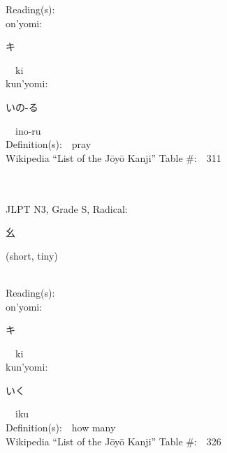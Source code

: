 \begin{multicols}{2}
Reading(s):\ \ \\
{\hspace*{1em}}on'yomi:\ \ \\
{\hspace*{2em}}{\begin{CJK}{UTF8}{min} キ \end{CJK}}\ \ ki\ \ \\
{\hspace*{1em}}kun'yomi:\ \ \\
{\hspace*{2em}}{\begin{CJK}{UTF8}{min} いの-る \end{CJK}}\ \ ino-ru\ \ \\
Definition(s):\ \ pray \\
Wikipedia ``List of the J\=oy\=o Kanji'' Table \#:\ \ 311 \\
\ \ \\
{\fontsize{34pt}{40pt}  }\ \ \\  %
{JLPT N3, Grade S, Radical:\ \ {\begin{CJK}{UTF8}{min} 幺 \end{CJK}} (short, tiny) } \\
Reading(s):\ \ \\
{\hspace*{1em}}on'yomi:\ \ \\
{\hspace*{2em}}{\begin{CJK}{UTF8}{min} キ \end{CJK}}\ \ ki\ \ \\
{\hspace*{1em}}kun'yomi:\ \ \\
{\hspace*{2em}}{\begin{CJK}{UTF8}{min} いく \end{CJK}}\ \ iku\ \ \\
Definition(s):\ \ how many \\
Wikipedia ``List of the J\=oy\=o Kanji'' Table \#:\ \ 326 \\
\ \ \\
{\fontsize{34pt}{40pt}  }\ \ \\  %

\end{multicols}
